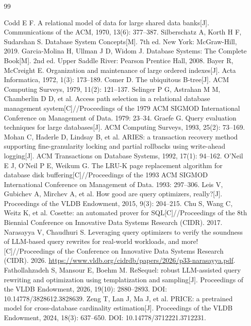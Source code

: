 \documentclass[a4paper,zihao=-4,UTF8,fontset=windows,linespread=1.35]{ctexart}
\begin{document}
\clearpage
\begin{thebibliography}{99}
\small
{} Codd E F. A relational model of data for large shared data banks[J]. Communications of the ACM, 1970, 13(6): 377--387.
 Silberschatz A, Korth H F, Sudarshan S. Database System Concepts[M]. 7th ed. New York: McGraw-Hill, 2019.
 Garcia-Molina H, Ullman J D, Widom J. Database Systems: The Complete Book[M]. 2nd ed. Upper Saddle River: Pearson Prentice Hall, 2008.
 Bayer R, McCreight E. Organization and maintenance of large ordered indexes[J]. Acta Informatica, 1972, 1(3): 173--189.
 Comer D. The ubiquitous B-tree[J]. ACM Computing Surveys, 1979, 11(2): 121--137.
 Selinger P G, Astrahan M M, Chamberlin D D, et al. Access path selection in a relational database management system[C]//Proceedings of the 1979 ACM SIGMOD International Conference on Management of Data. 1979: 23--34.
 Graefe G. Query evaluation techniques for large databases[J]. ACM Computing Surveys, 1993, 25(2): 73--169.
 Mohan C, Haderle D, Lindsay B, et al. ARIES: a transaction recovery method supporting fine-granularity locking and partial rollbacks using write-ahead logging[J]. ACM Transactions on Database Systems, 1992, 17(1): 94--162.
 O'Neil E J, O'Neil P E, Weikum G. The LRU-K page replacement algorithm for database disk buffering[C]//Proceedings of the 1993 ACM SIGMOD International Conference on Management of Data. 1993: 297--306.
 Leis V, Gubichev A, Mirchev A, et al. How good are query optimizers, really?[J]. Proceedings of the VLDB Endowment, 2015, 9(3): 204--215.
 Chu S, Wang C, Weitz K, et al. Cosette: an automated prover for SQL[C]//Proceedings of the 8th Biennial Conference on Innovative Data Systems Research (CIDR). 2017.
 Narasayya V, Chaudhuri S. Leveraging query optimizers to verify the soundness of LLM-based query rewrites for real-world workloads, and more![C]//Proceedings of the Conference on Innovative Data Systems Research (CIDR). 2026. \url{https://www.vldb.org/cidrdb/papers/2026/p33-narasayya.pdf}.
 Fathollahzadeh S, Mansour E, Boehm M. ReSequel: robust LLM-assisted query rewriting and optimization using templatization and sampling[J]. Proceedings of the VLDB Endowment, 2026, 19(10): 2880--2893. DOI: 10.14778/3828612.3828639.
 Zeng T, Lan J, Ma J, et al. PRICE: a pretrained model for cross-database cardinality estimation[J]. Proceedings of the VLDB Endowment, 2024, 18(3): 637--650. DOI: 10.14778/3712221.3712231.

\end{thebibliography}
\end{document}
